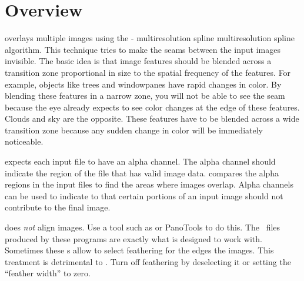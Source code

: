 

\chapter[Overview]{\label{sec:overview}%
  Overview}

%
%
%
%
%
\begin{sloppypar}
  \App{} overlays multiple images using the -
  multiresolution spline multiresolution spline algorithm.\footnotemark{} This technique tries
  to make the seams between the input images invisible.  The basic idea is that image features
  should be blended across a transition zone proportional in size to the spatial frequency of
  the features.  For example, objects like trees and windowpanes have rapid changes in color.
  By blending these features in a narrow zone, you will not be able to see the seam because the
  eye already expects to see color changes at the edge of these features.  Clouds and sky are
  the opposite.  These features have to be blended across a wide transition zone because any
  sudden change in color will be immediately noticeable.%
\end{sloppypar}

%
%
\App{} expects each input file to have an alpha channel.  The alpha channel should indicate the
region of the file that has valid image data.  \App{} compares the alpha regions in the input
files to find the areas where images overlap.  Alpha channels can be used to indicate to \App{}
that certain portions of an input image should not contribute to the final image.

%
%
%
\App{} does \emph{not} align images.  Use a tool such as  or PanoTools to do
this.  The ~files produced by these programs are exactly what \App{} is designed
to work with.  Sometimes these s allow to select feathering for the edges the
images.  This treatment is detrimental to \App{}.  Turn off feathering by deselecting it or
setting the ``feather width'' to zero.


